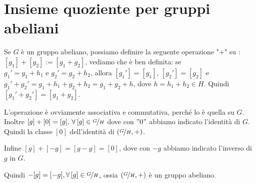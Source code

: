 \documentclass[../main.tex]{subfiles}
\begin{document}
\section{Insieme quoziente per gruppi abeliani}

Se $G$ è un gruppo abeliano, possiamo definire la seguente operazione "$+$"
su : $[g_1] + [g_2] := [g_1 + g_2]$, vediamo che è ben definita:
se $g_{1}' = g_1 + h_1 \text{ e } g_{2}' = g_2 + h_2$, allora $[g_{1}'] = [g_1]
$, $[g_{2}'] = [g_2]$ e $g_{1}' + g_{2}' = g_1 + h_1 + g_2 + h_2 = g_1 + g_2 + h$,
dove $h = h_1 + h_2 \in H$. Quindi $[g_{1}' + g_{2}'] = [g_1 + g_2]$.

L'operazione è ovviamente associativa e commutativa, perché lo è quella su $G$.
Inoltre $[g] + [0] = [g] \text{, } \forall [g] \in \nicefrac{G}{H}$ dove con $"0"$
abbiamo indicato l'identità di $G$. Quindi la classe $[0]$ dell'identità di $(\nicefrac{G}{H} , +)$.

Infine $[g] + [-g] = [g-g] = [0]$, dove con $-g$ abbiamo indicato l'inverso di $g$ in $G$.

Quindi $-[g] = [-g], \forall [g] \in \nicefrac{G}{H}$, ossia $(\nicefrac{G}{H},+)$ è un gruppo abeliano.
\end{document}

